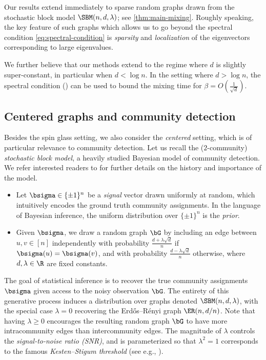 \documentclass[11pt,letterpaper]{article}
\begin{document}
Our results extend immediately to sparse random graphs drawn from the stochastic block model $\SBM(n, d, \lambda)$; see \cref{thm:main-mixing}. Roughly speaking, the key feature of such graphs which allows us to go beyond the spectral condition \cref{eq:spectral-condition} is \emph{sparsity} and \emph{localization} of the eigenvectors corresponding to large eigenvalues.

\begin{remark}
    We further believe that our methods extend to the regime where $d$ is slightly super-constant, in particular when $d < \log n$. In the setting where $d > \log n$, the spectral condition () can be used to bound the mixing time for $\beta = O\left(\frac{1}{\sqrt{d}}\right)$.
\end{remark}

\subsection{Centered graphs and community detection}
Besides the spin glass setting, we also consider the \emph{centered} setting, which is of particular relevance to community detection. Let us recall the ($2$-community) \emph{stochastic block model}, a heavily studied Bayesian model of community detection. We refer interested readers to \cite{Abb18} for further details on the history and importance of the model.
\begin{itemize}
    \item Let $\bsigma \in \{\pm1\}^{n}$ be a \emph{signal} vector drawn uniformly at random, which intuitively encodes the ground truth community assignments. In the language of Bayesian inference, the uniform distribution over $\{\pm1\}^{n}$ is the \emph{prior}.
    \item Given $\bsigma$, we draw a random graph $\bG$ by including an edge between $u,v \in [n]$ independently with probability $\frac{d + \lambda \sqrt{d}}{n}$ if $\bsigma(u) = \bsigma(v)$, and with probability $\frac{d - \lambda\sqrt{d}}{n}$ otherwise, where $d, \lambda \in \R$ are fixed constants.
\end{itemize}
The goal of statistical inference is to recover the true community assignments $\bsigma$ given access to the noisy observation $\bG$. The entirety of this generative process induces a distribution over graphs denoted $\SBM(n, d, \lambda)$, with the special case $\lambda = 0$ recovering the Erd\H{o}s--R\'{e}nyi graph $\ER(n,d/n)$. Note that having $\lambda \geq 0$ encourages the resulting random graph $\bG$ to have more intracommunity edges than intercommunity edges. The magnitude of $\lambda$ controls the \emph{signal-to-noise ratio (SNR)}, and is parameterized so that $\lambda^2 = 1$ corresponds to the famous \emph{Kesten--Stigum threshold} (see e.g., \cite{DKMZ11, MNS15}).
\end{document}
